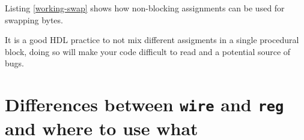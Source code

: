 \documentclass[a4paper,10pt]{article}
\theoremstyle{mytheor}
\newcommand{
  \insertverilog}[3]{
  
}
\newcounter{pitfallCount} %
\newcommand{\pitfallcounter}[1]{%
  \refstepcounter{pitfallCount}%
  \thepitfallCount%
  \label{#1}}%
\newcommand{\pitfall}[2] {
  \begin{tcolorbox}[arc=1pt,colback=yellow!10!white,colframe=orange!75!black,title=\textbf{Common Pitfall - \pitfallcounter{#1}}]
    #2
  \end{tcolorbox}
}
\newcommand{\inlinev}[1]{\lstinline[style=verilog-inline-style]{#1}}
\begin{document}
Listing \ref{working-swap} shows how non-blocking assignments can be
used for swapping bytes.

\insertverilog{./verilog_files/workingSwap.v}{working-swap}{Swapping
  bytes using non-blocking assignment\, it works!}

\pitfall{pitfall:mixing-assignments}{It is a good HDL practice to not mix different assigments in
  a single procedural block, doing so will make your code difficult to
  read and a potential source of bugs.}

\section{Differences between \inlinev{wire} and \inlinev{reg} and where to use what}
\newcommand\markupg[1]{\textbf{\color{vgreen}#1}}
\newcommand\markupr[1]{\textbf{\color{red}#1}}

\def\checkmark{\tikz\fill[scale=0.4](0,.25) -- (.25,0) -- (0.7,.50) -- (0.7,.65) -- (.25,.15) -- (0,.40) -- cycle;}  
\def\scalecheck{\resizebox{\widthof{\checkmark}*\ratio{\widthof{x}}{\widthof{\normalsize x}}}{!}{\checkmark}}

\newcommand\dangersign[1][2ex]{%
  \renewcommand\stacktype{L}%
  \scaleto{\stackon[1.3pt]{\color{amber}$\triangle$}{\tiny\color{amber} !}}{#1}%
}
\end{document}
